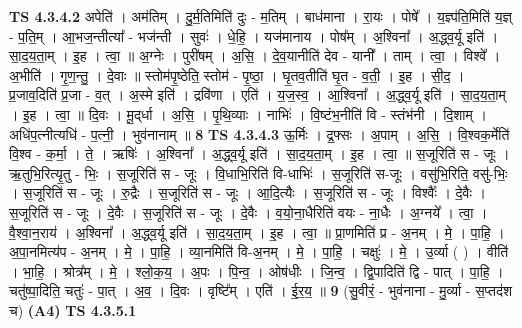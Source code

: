 \documentclass[17pt]{extarticle}
\begin{document}
                  \newline
                                \textbf{ TS 4.3.4.2} \newline
                  अपेति॑ । अम॑तिम् । दु॒र्म॒तिमिति॑ दुः - म॒तिम् । बाध॑माना । रा॒यः । पोषे᳚ । य॒ज्ञ्प॑ति॒मिति॑ य॒ज्ञ् - प॒ति॒म् । आ॒भज॒न्तीत्या᳚ - भज॑न्ती । सुवः॑ । धे॒हि॒ । यज॑मानाय । पोष᳚म् । अ॒श्विना᳚ । अ॒द्ध्व॒र्यू इति॑ । सा॒द॒य॒ता॒म् । इ॒ह । त्वा॒ ॥ अ॒ग्नेः । पुरी॑षम् । अ॒सि॒ । दे॒व॒यानीति॑ देव - यानी᳚ । ताम् । त्वा॒ । विश्वे᳚ । अ॒भीति॑ । गृ॒ण॒न्तु॒ । दे॒वाः ॥ स्तोम॑पृ॒ष्ठेति॒ स्तोम॑ - पृ॒ष्ठा॒ । घृ॒तव॒तीति॑ घृ॒त - व॒ती॒ । इ॒ह । सी॒द॒ । प्र॒जाव॒दिति॑ प्र॒जा - व॒त् । अ॒स्मे इति॑ । द्रवि॑णा । एति॑ । य॒ज॒स्व॒ । आ॒श्विना᳚ । अ॒द्ध्व॒र्यू इति॑ । सा॒द॒य॒ता॒म् । इ॒ह । त्वा॒ ॥ दि॒वः । मू॒द्‌र्धा । अ॒सि॒ । पृ॒थि॒व्याः । नाभिः॑ । वि॒ष्टंभ॒नीति॑ वि - स्तंभ॑नी । दि॒शाम् । अधि॑प॒त्नीत्यधि॑ - प॒त्नी॒ । भुव॑नानाम् ॥ \textbf{  8} \newline
                  \newline
                                \textbf{ TS 4.3.4.3} \newline
                  ऊ॒र्मिः । द्र॒फ्सः । अ॒पाम् । अ॒सि॒ । वि॒श्वक॒र्मेति॑ वि॒श्व - क॒र्मा॒ । ते॒ । ऋषिः॑ । अ॒श्विना᳚ । अ॒द्ध्व॒र्यू इति॑ । सा॒द॒य॒ता॒म् । इ॒ह । त्वा॒ ॥ स॒जूरिति॑ स - जूः । ऋ॒तुभि॒रित्यृ॒तु - भिः॒ । स॒जूरिति॑ स - जूः । वि॒धाभि॒रिति॑ वि-धाभिः॑ । स॒जूरिति॑ स-जूः । वसु॑भि॒रिति॒ वसु॑-भिः॒ । स॒जूरिति॑ स - जूः । रु॒द्रैः । स॒जूरिति॑ स - जूः । आ॒दि॒त्यैः । स॒जूरिति॑ स - जूः । विश्वैः᳚ । दे॒वैः । स॒जूरिति॑ स - जूः । दे॒वैः । स॒जूरिति॑ स - जूः । दे॒वैः । व॒यो॒ना॒धैरिति॑ वयः - ना॒धैः । अ॒ग्नये᳚ । त्वा॒ । वै॒श्वा॒न॒राय॑ । अ॒श्विना᳚ । अ॒द्ध्व॒र्यू इति॑ । सा॒द॒य॒ता॒म् । इ॒ह । त्वा॒ ॥ प्रा॒णमिति॑ प्र - अ॒नम् । मे॒ । पा॒हि॒ । अ॒पा॒नमित्य॑प - अ॒नम् । मे॒ । पा॒हि॒ । व्या॒नमिति॑ वि-अ॒नम् । मे॒ । पा॒हि॒ । चक्षुः॑ । मे॒ । उ॒र्व्या ( ) । वीति॑ । भा॒हि॒ । श्रोत्र᳚म् । मे॒ । श्लो॒क॒य॒ । अ॒पः । पि॒न्व॒ । ओष॑धीः । जि॒न्व॒ । द्वि॒पादिति॑ द्वि - पात् । पा॒हि॒ । चतु॑ष्पा॒दिति॒ चतुः॑ - पा॒त् । अ॒व॒ । दि॒वः । वृष्टि᳚म् । एति॑ । ई॒र॒य॒ ॥ \textbf{  9 } \newline
                  \newline
                      (सु॒वीरं॒ - भुव॑नाना - मु॒र्व्या - स॒प्तद॑श च)  \textbf{(A4)} \newline \newline
                                \textbf{ TS 4.3.5.1} \newline
\end{document}
